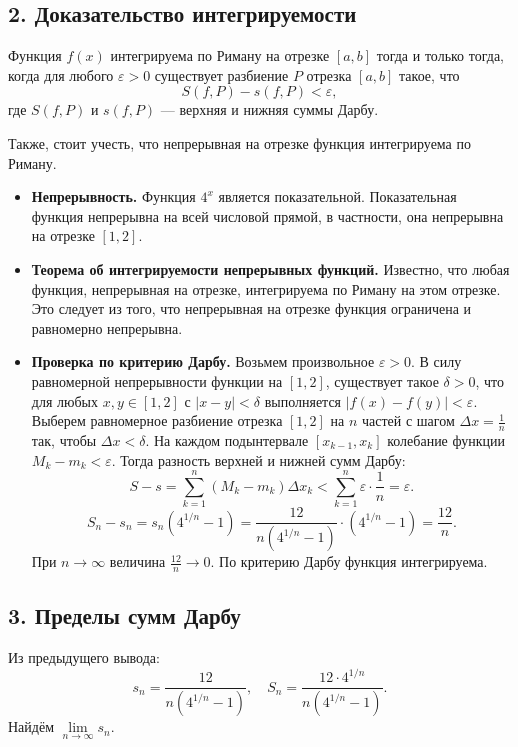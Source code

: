 \documentclass[12pt,a4paper]{article}
\begin{document}
\subsection*{2. Доказательство интегрируемости}

Функция $f(x)$ интегрируема по Риману на отрезке $[a, b]$ тогда и только тогда, когда для любого $\varepsilon > 0$ существует разбиение $P$ отрезка $[a, b]$ такое, что
\[
S(f, P) - s(f, P) < \varepsilon,
\]
где $S(f, P)$ и $s(f, P)$ --- верхняя и нижняя суммы Дарбу.

Также, стоит учесть, что непрерывная на отрезке функция интегрируема по Риману.

\begin{itemize}
    \item \textbf{Непрерывность.} Функция $4^x$ является показательной. Показательная функция непрерывна на всей числовой прямой, в частности, она непрерывна на отрезке $[1, 2]$.
    \item \textbf{Теорема об интегрируемости непрерывных функций.} Известно, что любая функция, непрерывная на отрезке, интегрируема по Риману на этом отрезке. Это следует из того, что непрерывная на отрезке функция ограничена и равномерно непрерывна.
    \item \textbf{Проверка по критерию Дарбу.} Возьмем произвольное $\varepsilon > 0$. В силу равномерной непрерывности функции на $[1, 2]$, существует такое $\delta > 0$, что для любых $x, y \in [1, 2]$ с $|x - y| < \delta$ выполняется $|f(x) - f(y)| < \varepsilon$. Выберем равномерное разбиение отрезка $[1, 2]$ на $n$ частей с шагом $\Delta x = \frac{1}{n}$ так, чтобы $\Delta x < \delta$. На каждом подынтервале $[x_{k-1}, x_k]$ колебание функции $M_k - m_k < \varepsilon$. Тогда разность верхней и нижней сумм Дарбу:
    \[
    S - s = \sum_{k=1}^{n} (M_k - m_k) \Delta x_k < \sum_{k=1}^{n} \varepsilon \cdot \frac{1}{n} = \varepsilon.
    \]
    \[
    S_n - s_n = s_n(4^{1/n} - 1) = \frac{12}{n(4^{1/n} - 1)} \cdot (4^{1/n} - 1) = \frac{12}{n}.
    \]
    При $n \to \infty$ величина $\frac{12}{n} \to 0$. По критерию Дарбу функция интегрируема.
\end{itemize}

\subsection*{3. Пределы сумм Дарбу}

Из предыдущего вывода:
\[
s_n = \frac{12}{n(4^{1/n} - 1)}, \quad S_n = \frac{12 \cdot 4^{1/n}}{n(4^{1/n} - 1)}.
\]
Найдём $\lim\limits_{n\to\infty} s_n$.
\end{document}
